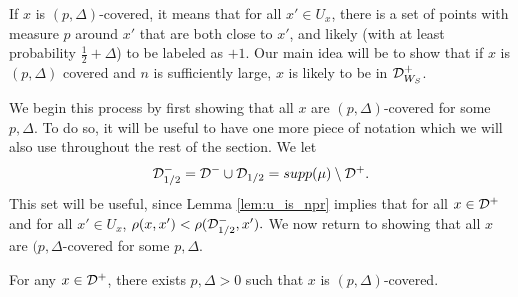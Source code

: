 If $x$ is $(p, \Delta)$-covered, it means that for all $x' \in U_x$, there is a set of points with measure $p$ around $x'$ that are both close to $x'$, and likely (with at least probability $\frac{1}{2} + \Delta$) to be labeled as $+1$. Our main idea will be to show that if $x$ is $(p, \Delta)$ covered and $n$ is sufficiently large, $x$ is likely to be in ${\mathcal D}_{W_S}^+$. 

We begin this process by first showing that all $x$ are $(p, \Delta)$-covered for some $p, \Delta$. To do so, it will be useful to have one more piece of notation which we will also use throughout the rest of the section. We let $${\mathcal D}_{1/2}^{-} = {\mathcal D}^- \cup {\mathcal D}_{1/2} = supp(\mu) \setminus {\mathcal D}^+.$$ This set will be useful, since Lemma \ref{lem:u_is_npr} implies that for all $x \in {\mathcal D}^+$ and for all $x' \in U_x$, $\rho(x, x') < \rho({\mathcal D}_{1/2}^{-}, x').$ We now return to showing that all $x$ are $(p, \Delta$-covered for some $p, \Delta$.

\begin{lem}\label{lem:everything_covered}
For any $x \in {\mathcal D}^+$, there exists $p, \Delta > 0$ such that $x$ is $(p, \Delta)$-covered.
\end{lem}

